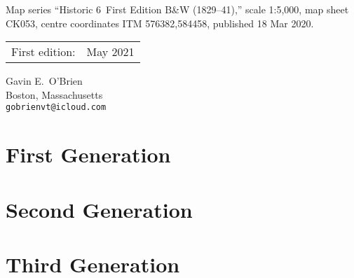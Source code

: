 \documentclass[ebook]{memoir}
\begin{document}
Map series ``Historic 6\textquotedbl\ First Edition B\&W (1829--41),'' scale 1:5,000, map sheet CK053, centre coordinates ITM 576382,584458, published 18 Mar 2020.

\begin{center}
	\begin{tabular}{ll}
		First edition:  & May 2021 \\
	\end{tabular}
\end{center}

Gavin E.\ O'Brien\\
Boston, Massachusetts\\
\texttt{gobrienvt@icloud.com}

\vspace*{2\baselineskip}

\endgroup
\clearpage
\pagestyle{ssheadings}

\begin{KeepFromToc}
\tableofcontents
\end{KeepFromToc}

\cleardoublepage

\listoffigures

\cleardoublepage



\cleartoverso

\cleardoublepage

\mainmatter
% 


% 
\chapter{First Generation}


\chapter{Second Generation}






\chapter{Third Generation}









\end{document}
